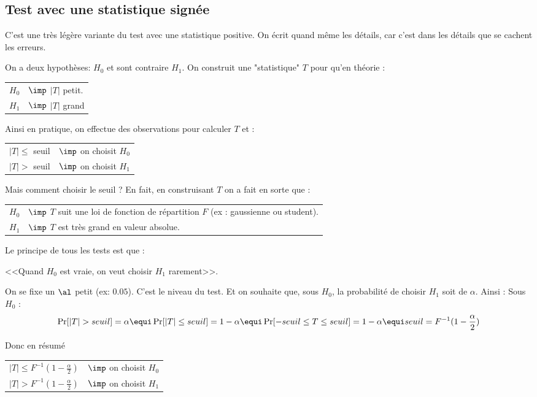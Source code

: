 \documentclass{article}
\begin{document}
\subsection{Test avec une statistique signée}

C'est une très légère variante du test avec une statistique positive. On écrit  quand même les détails, car c'est dans les détails que se cachent les erreurs.  


On a deux hypothèses:  $H_0$ et sont
 contraire $H_1$.  
On construit une "statistique" $T$ pour qu'en théorie :

\begin{tabular}{ll}
$H_0$  &$\imp$  $|T|$ petit. \\
$H_1$  &$\imp$  $|T|$ grand
\end{tabular}

Ainsi en pratique, on effectue des observations pour calculer $T$ et :

\begin{tabular}{ll}
$|T| \leq$ seuil  &$\imp$    on choisit $H_0$ \\
$|T| >$  seuil &$\imp$   on choisit $H_1$
\end{tabular}

Mais comment choisir le seuil ?  En fait, en construisant $T$ on a fait en sorte que :

\begin{tabular}{ll}
$H_0$  &$\imp$  $T$ suit une loi de fonction de répartition $F$  (ex :  gaussienne ou student). \\
$H_1$  &$\imp$  $T$ est très  grand en valeur absolue. 
\end{tabular}


Le principe de tous les tests est que : 
\begin{center}
<<Quand $H_0$ est vraie, on veut choisir $H_1$ rarement>>. 
\end{center}
On se fixe  un $\al$ petit (ex: $0.05$). C'est le niveau du test.  Et on souhaite que, sous $H_0$, la probabilité de choisir $H_1$ soit de $\alpha$.  Ainsi : Sous $H_0$ :
$$
\Pr[|T|>seuil] = \alpha  \equi  \Pr[|T| \leq seuil] =1- \alpha \equi    \Pr[-seuil \leq T \leq seuil]  =1- \alpha   \equi  seuil = F^{-1} (1-\frac {\alpha}2)
$$


Donc en résumé

\begin{tabular}{ll}
$|T| \leq  F^{-1}(1-\frac {\alpha}2)$   &$\imp$    on choisit $H_0$ \\
$|T| > F^{-1}(1-\frac {\alpha}2)  $     &$\imp$   on choisit $H_1$
\end{tabular}
\end{document}
